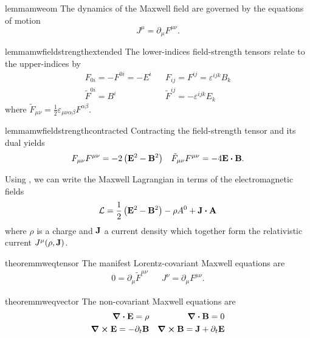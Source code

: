 \begin{restatable}{lemma}{mweom}\label{thm:mw_eom}
	The dynamics of the Maxwell field are governed by the equations of motion
	\begin{equation}
		J^\mu
		=
		\partial_\mu
		F^{\mu\nu}
		\label{eq:mw_eom}
		.
	\end{equation}
\end{restatable}
\begin{restatable}{lemma}{mwfieldstrengthextended}\label{thm:mw_field_strength_extended}
	The lower-indices field-strength tensors relate to the upper-indices by
	\begin{align}
		F_{0i}
		=
		-
		F^{0i}
		=
		-
		E^i
		&&
		F_{ij}
		=
		F^{ij}
		=
		\varepsilon^{ijk}
		B_k
		\\
		\tilde{F}^{0i}
		=
		B^i
		&&
		\tilde{F}^{ij}
		=
		-
		\varepsilon^{ijk}
		E_k
	\end{align}
	where $\tilde{F}_{\mu\nu}=\frac{1}{2}
		\varepsilon_{\mu\nu\alpha\beta}
		F^{\alpha\beta}$.
\end{restatable}
\begin{restatable}{lemma}{mwfieldstrengthcontracted}\label{thm:mw_field_strength_contracted}
	Contracting the field-strength tensor and its dual yields
		\begin{align}
		F_{\mu\nu}
		F^{\mu\nu}
		=
		-2
		\left(
			\vb{E}^2
			-
			\vb{B}^2
		\right)
		&&
		\tilde{F}_{\mu\nu}
		F^{\mu\nu}
		=
		-
		4
		\vb{E}
		\vdot
		\vb{B}
		.
	\end{align}
\end{restatable}
\begin{corollary}
	Using , we can write the Maxwell Lagrangian in terms of the electromagnetic fields
	\begin{equation}
		\mathcal{L}
		=
		\frac{1}{2}
		\left(
			\vb{E}^2
			-
			\vb{B}^2
		\right)
		-
		\rho A^0
		+
		\vb{J}\vdot\vb{A}
	\end{equation}
	where $\rho$ is a charge and $\vb{J}$ a current density which together form the relativistic current $J^\mu(\rho,\vb{J})$.
\end{corollary}

\begin{restatable}{theorem}{mweqtensor}\label{thm:tensor_maxwell_equations}
	The manifest Lorentz-covariant Maxwell equations are
	\begin{align}
		0
		=
		\partial_\mu
		\tilde{F}^{\mu\nu}
		&&
		J^\nu
		=
		\partial_\mu
		F^{\mu\nu}
		.
	\end{align}
\end{restatable}
\begin{restatable}{theorem}{mweqvector}\label{thm:vector_maxwell_equations}
	The non-covariant Maxwell equations are
	\begin{align}
		\div\vb{E}
		=
		\rho
		&&
		\div\vb{B}
		=
		0
		\label{eq:mw_homo_vec}
		\\
		\curl\vb{E}
		=
		-
		\partial_t\vb{B}
		&&
		\curl\vb{B}
		=
		\vb{J}
		+
		\partial_t\vb{E}
		\label{eq:mw_inhomo_vec}
	\end{align}
\end{restatable}


